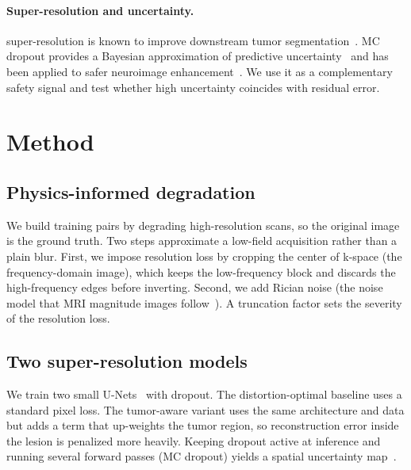 \documentclass[11pt,a4paper]{article}
\newcommand{\SR}{super-resolution\xspace}
\begin{document}
\paragraph{Super-resolution and uncertainty.}
\SR is known to improve downstream tumor segmentation~\cite{zhou2022}. MC dropout provides a Bayesian approximation of predictive uncertainty~\cite{gal2016} and has been applied to safer neuroimage enhancement~\cite{tanno2021}. We use it as a complementary safety signal and test whether high uncertainty coincides with residual error.

\section{Method}

\subsection{Physics-informed degradation}
We build training pairs by degrading high-resolution scans, so the original image is the ground truth. Two steps approximate a low-field acquisition rather than a plain blur. First, we impose resolution loss by cropping the center of k-space (the frequency-domain image), which keeps the low-frequency block and discards the high-frequency edges before inverting. Second, we add Rician noise (the noise model that MRI magnitude images follow~\cite{gudbjartsson1995}). A truncation factor sets the severity of the resolution loss.

\subsection{Two super-resolution models}
We train two small U-Nets~\cite{ronneberger2015} with dropout. The distortion-optimal baseline uses a standard pixel loss. The tumor-aware variant uses the same architecture and data but adds a term that up-weights the tumor region, so reconstruction error inside the lesion is penalized more heavily. Keeping dropout active at inference and running several forward passes (MC dropout) yields a spatial uncertainty map~\cite{gal2016}.
\end{document}
